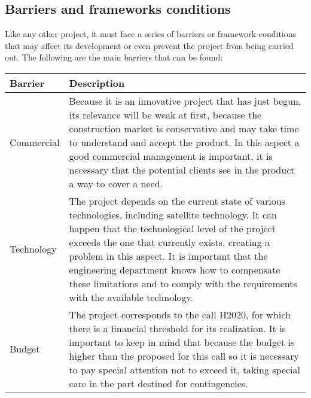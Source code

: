 \subsection{Barriers and frameworks conditions}

Like any other project, it must face a series of barriers or framework conditions that may affect its development or even prevent the project from being carried out. The following are the main barriers that can be found:

\begin{table}[H]
	\centering
	\begin{tabular}{l p{12cm}}
		
		\toprule[2pt]
		
		\textbf{Barrier} &  \textbf{Description}\\
		
		\midrule [1.5pt]
		
		Commercial & Because it is an innovative project that has just begun, its relevance will be weak at first, because the construction market is conservative and may take time to understand and accept the product.
		In this aspect a good commercial management is important, it is necessary that the potential clients see in the product a way to cover a need.
		\vspace{0.2cm}\\
		
		\midrule
		
		Technology & The project depends on the current state of various technologies, including satellite technology. It can happen that the technological level of the project exceeds the one that currently exists, creating a problem in this aspect. It is important that the engineering department knows how to compensate these limitations and to comply with the requirements with the available technology.\vspace{0.2cm}\\
		
		\midrule
		
		Budget & The project corresponds to the call H2020, for which there is a financial threshold for its realization. It is important to keep in mind that because the budget is higher than the proposed for this call so it is necessary to pay special attention not to exceed it, taking special care in the part destined for contingencies.\vspace{0.2cm}\\
		
		\midrule
		

\end{tabular}
\end{table}
